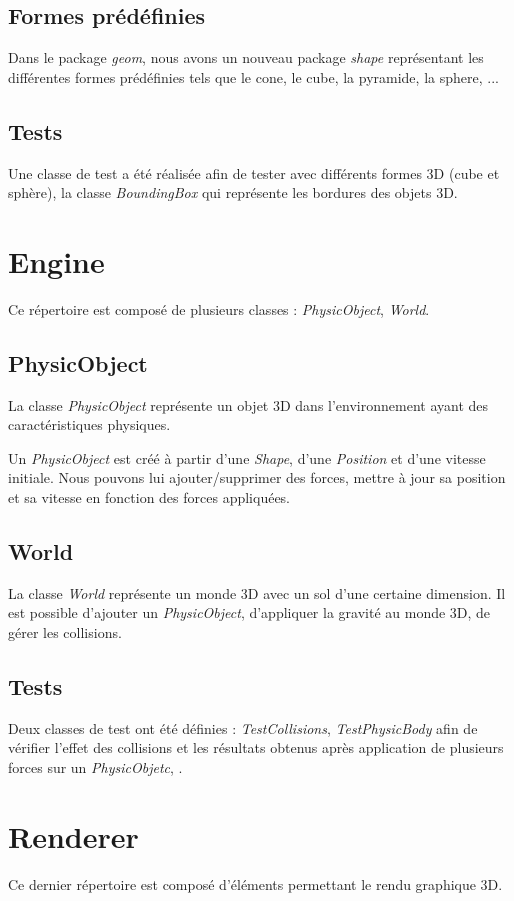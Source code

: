 \documentclass[11pt]{report}
\begin{document}
\subsection{Formes prédéfinies}
Dans le package \textit{geom}, nous avons un nouveau package \textit{shape} représentant les différentes formes prédéfinies tels que le cone, le cube, la pyramide, la sphere, ...

\subsection{Tests}
Une classe de test a été réalisée afin de tester avec différents formes 3D (cube et sphère), la classe \textit{BoundingBox} qui représente les bordures des objets 3D.

\section{Engine}
Ce répertoire est composé de plusieurs classes : \textit{PhysicObject}, \textit{World}.

\subsection{PhysicObject}
La classe \textit{PhysicObject} représente un objet 3D dans l'environnement ayant des caractéristiques physiques.

Un \textit{PhysicObject} est créé à partir d'une \textit{Shape}, d'une \textit{Position} et d'une vitesse initiale.
Nous pouvons lui ajouter/supprimer des forces, mettre à jour sa position et sa vitesse en fonction des forces appliquées.

\subsection{World}
La classe \textit{World} représente un monde 3D avec un sol d'une certaine dimension. Il est possible d'ajouter un \textit{PhysicObject}, d'appliquer la gravité au monde 3D, de gérer les collisions.

\subsection{Tests}
Deux classes de test ont été définies : \textit{TestCollisions}, \textit{TestPhysicBody} afin de vérifier l'effet des collisions et les résultats obtenus après application de plusieurs forces sur un \textit{PhysicObjetc}, . 

\section{Renderer}
Ce dernier répertoire est composé d'éléments permettant le rendu graphique 3D.
\end{document}
